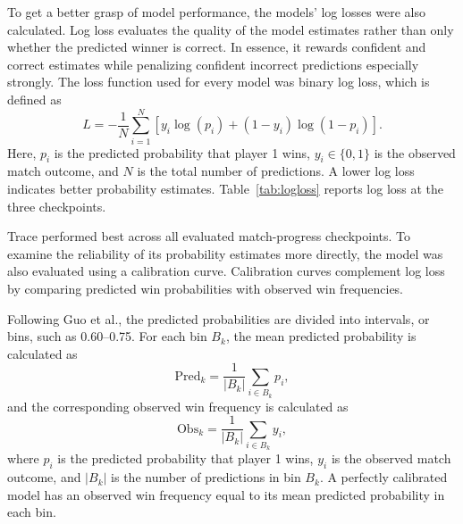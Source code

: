 \documentclass[10pt,twocolumn]{article}
\begin{document}
To get a better grasp of model performance, the models' log losses were also calculated. Log loss evaluates the quality of the model estimates rather than only whether the predicted winner is correct. In essence, it rewards confident and correct estimates while penalizing confident incorrect predictions especially strongly. The loss function used for every model was binary log loss, which is defined as
\begin{equation}
L=-\frac{1}{N}\sum_{i=1}^{N}\left[y_i\log(p_i)+(1-y_i)\log(1-p_i)\right].
\end{equation}
Here, $p_i$ is the predicted probability that player 1 wins, $y_i\in\{0,1\}$ is the observed match outcome, and $N$ is the total number of predictions. A lower log loss indicates better probability estimates. Table~\ref{tab:logloss} reports log loss at the three checkpoints.

\begin{table}[H]
\centering
\caption{Model log loss at fixed match-progress checkpoints; HGBM denotes the histogram gradient-boosting model, and Trace has the lowest log loss at all three checkpoints. Source: authors' model evaluation.\cite{xie2026}}
\label{tab:logloss}
\end{table}

Trace performed best across all evaluated match-progress checkpoints. To examine the reliability of its probability estimates more directly, the model was also evaluated using a calibration curve. Calibration curves complement log loss by comparing predicted win probabilities with observed win frequencies.

Following Guo et al.,\cite{guo2017} the predicted probabilities are divided into intervals, or bins, such as 0.60--0.75. For each bin $B_k$, the mean predicted probability is calculated as
\begin{equation}
\mathrm{Pred}_k=\frac{1}{|B_k|}\sum_{i\in B_k}p_i,
\end{equation}
and the corresponding observed win frequency is calculated as
\begin{equation}
\mathrm{Obs}_k=\frac{1}{|B_k|}\sum_{i\in B_k}y_i,
\end{equation}
where $p_i$ is the predicted probability that player 1 wins, $y_i$ is the observed match outcome, and $|B_k|$ is the number of predictions in bin $B_k$. A perfectly calibrated model has an observed win frequency equal to its mean predicted probability in each bin.
\end{document}
